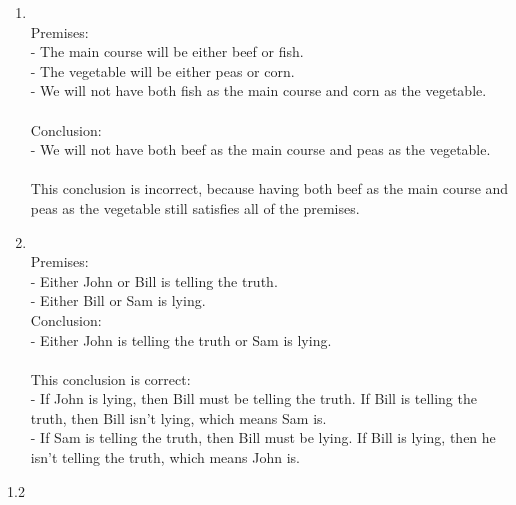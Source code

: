 \documentclass[12pt]{exam}
\begin{document}
\begin{enumerate}
\begin{enumerate}
            \item ~\\
                Premises: \\
                 - The main course will be either beef or fish.\\
                 - The vegetable will be either peas or corn.\\
                 - We will not have both fish as the main course and corn as the vegetable. \\
                ~\\
                Conclusion: \\
                 - We will not have both beef as the main course and peas as the vegetable. \\
                ~\\
                This conclusion is incorrect, because having both beef as the main course and peas as the vegetable still satisfies all of the premises.

            \item ~\\
                Premises: \\
                 - Either John or Bill is telling the truth.\\
                 - Either Bill or Sam is lying.
                ~\\
                Conclusion: \\
                 - Either John is telling the truth or Sam is lying. \\
                ~\\
                This conclusion is correct:\\
                 - If John is lying, then Bill must be telling the truth. If Bill is telling the truth, then Bill isn't lying, which means Sam is. \\
                 - If Sam is telling the truth, then Bill must be lying. If Bill is lying, then he isn't telling the truth, which means John is. 
                

        \end{enumerate}

    
\end{enumerate}

1.2
\end{document}
